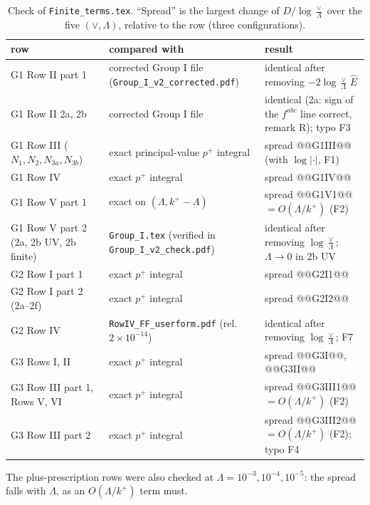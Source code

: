 \documentclass[10pt]{article}
\numberwithin{equation}{section}
\newcommand{\Eh}{\hat E}
\begin{document}
\begin{table}[H]\centering\small
\caption{Check of \texttt{Finite\_terms.tex}. ``Spread'' is the largest change of $D/\log\frac{\vee}{\Lambda}$ over the five $(\vee,\Lambda)$, relative to the row (three configurations).}\label{tab:check}
\begin{tabular}{@{}>{\raggedright\arraybackslash}p{}>{\raggedright\arraybackslash}p{}>{\raggedright\arraybackslash}p{}@{}}\toprule
row & compared with & result\\\midrule
G1 Row II part 1 & corrected Group I file (\texttt{Group\_I\_v2\_corrected.pdf}) & identical after removing $-2\log\frac{\vee}{\Lambda}\,\Eh$\\
G1 Row II 2a, 2b & corrected Group I file & identical (2a: sign of the $f^{abc}$ line correct, remark R); typo F3\\
G1 Row III ($N_1,N_2,N_{3a},N_{3b}$) & exact principal-value $p^+$ integral & spread @@G1III@@ (with $\log|\cdot|$, F1)\\
G1 Row IV & exact $p^+$ integral & spread @@G1IV@@\\
G1 Row V part 1 & exact on $(\Lambda,k^+-\Lambda)$ & spread @@G1V1@@ $=O(\Lambda/k^+)$ (F2)\\
G1 Row V part 2 (2a, 2b UV, 2b finite) & \texttt{Group\_I.tex} (verified in \texttt{Group\_I\_v2\_check.pdf}) & identical after removing $\log\frac{\vee}{\Lambda}$; $\Lambda\to0$ in 2b UV\\
G2 Row I part 1 & exact $p^+$ integral & spread @@G2I1@@\\
G2 Row I part 2 (2a--2f) & exact $p^+$ integral & spread @@G2I2@@\\
G2 Row IV & \texttt{RowIV\_FF\_userform.pdf} (rel.\ $2\times10^{-14}$) & identical after removing $\log\frac{\vee}{\Lambda}$; F7\\
G3 Rows I, II & exact $p^+$ integral & spread @@G3I@@, @@G3II@@\\
G3 Row III part 1, Rows V, VI & exact $p^+$ integral & spread @@G3III1@@ $=O(\Lambda/k^+)$ (F2)\\
G3 Row III part 2 & exact $p^+$ integral & spread @@G3III2@@ $=O(\Lambda/k^+)$ (F2); typo F4\\\bottomrule
\end{tabular}
\end{table}
The plus-prescription rows were also checked at $\Lambda=10^{-3},10^{-4},10^{-5}$: the spread falls with $\Lambda$, as an $O(\Lambda/k^+)$ term must.
\end{document}
